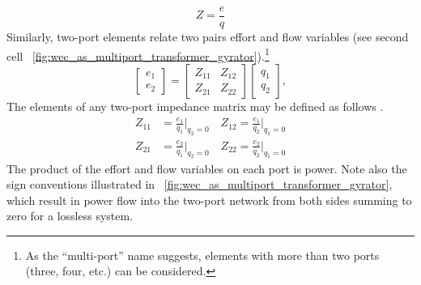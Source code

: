 \documentclass[lettersize,journal]{IEEEtran}
\begin{document}
%
\begin{equation}
        Z = \frac{e}{q}
\end{equation}
%
Similarly, two-port elements relate two pairs effort and flow variables (see second cell \figurename~\ref{fig:wec_as_multiport_transformer_gyrator}).\footnote{As the ``multi-port'' name suggests, elements with more than two ports (three, four, etc.) can be considered.}
%
\begin{equation} \label{eq:Z_mat_def_general}
        \begin{bmatrix} e_1 \\ e_2 \end{bmatrix} = \begin{bmatrix} Z_{11} & Z_{12} \\ Z_{21} & Z_{22} \end{bmatrix} \begin{bmatrix} q_1 \\ q_2 \end{bmatrix},
\end{equation}
%
The elements of any two-port impedance matrix may be defined as follows \cite{CircuitFundamental}.
%
\begin{equation} \label{eq:Z_mat_elements_def}
        \begin{aligned}
                Z_{11}& = \frac{e_1}{q_1} \bigg \vert_{q_2=0} \quad
                Z_{12} = \frac{e_1}{q_2} \bigg \vert_{q_1=0}  \\[1em]
                Z_{21}& = \frac{e_2}{q_1} \bigg \vert_{q_2=0} \quad
                Z_{22} = \frac{e_2}{q_2} \bigg \vert_{q_1=0} 
        \end{aligned}
\end{equation}
%
The product of the effort and flow variables on each port is power.
Note also the sign conventions illustrated in \figurename~\ref{fig:wec_as_multiport_transformer_gyrator}, which result in power flow into the two-port network from both sides summing to zero for a lossless system.
\end{document}
